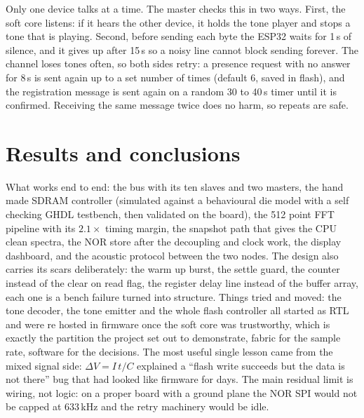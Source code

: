 \documentclass[a4paper,10pt]{article}
\begin{document}
Only one device talks at a time. The master checks this in two ways. First, the soft core
listens: if it hears the other device, it holds the tone player and stops a tone that is
playing. Second, before sending each byte the ESP32 waits for 1\,s of silence, and it gives
up after 15\,s so a noisy line cannot block sending forever. The channel loses tones often,
so both sides retry: a presence request with no answer for 8\,s is sent again up to a set
number of times (default 6, saved in flash), and the registration message is sent again on a
random 30 to 40\,s timer until it is confirmed. Receiving the same message twice does no
harm, so repeats are safe.

\section{Results and conclusions}

What works end to end: the bus with its ten slaves and two masters, the hand made
SDRAM controller (simulated against a behavioural die model with a self checking
GHDL testbench, then validated on the board), the 512 point FFT pipeline with its
$2.1\times$ timing margin, the snapshot path that gives the CPU clean spectra, the
NOR store after the decoupling and clock work, the display dashboard, and the acoustic
protocol between the two nodes. The design also carries its scars deliberately: the
warm up burst, the settle guard, the counter instead of the clear on read flag, the
register delay line instead of the buffer array, each one is a bench failure
turned into structure. Things tried and moved: the tone decoder, the tone emitter
and the whole flash controller all started as RTL and were re hosted in firmware
once the soft core was trustworthy, which is exactly the partition the project set
out to demonstrate, fabric for the sample rate, software for the decisions. The
most useful single lesson came from the mixed signal side: $\Delta V = I\,t/C$
explained a ``flash write succeeds but the data is not there'' bug that had looked
like firmware for days. The main residual limit is wiring, not logic: on a proper
board with a ground plane the NOR SPI would not be capped at 633\,kHz and the
retry machinery would be idle.
\end{document}
